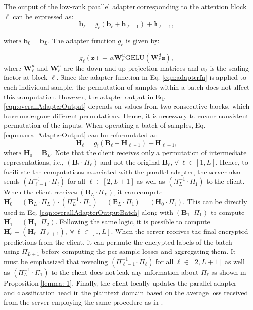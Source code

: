 The output of the low-rank parallel adapter corresponding to the attention block $\ell$ can be expressed as:
\begin{equation}
    \mathbf{h}_{\ell} = g_{\ell}(\mathbf{b}_{\ell} + \mathbf{h}_{\ell-1}) + \mathbf{h}_{\ell-1},
    \label{eqn:overallAdapterOutput}
\end{equation}

\noindent where $\mathbf{h}_{0} = \mathbf{b}_L$. The adapter function $g_{\ell}$ is given by:

\begin{equation}
    g_{\ell}(\mathbf{z}) = \alpha \mathbf{W}_{\ell}^u \text{GELU}(\mathbf{W}_{\ell}^d\mathbf{z}),
    \label{eqn:adapterfn}
\end{equation}
\noindent where $\mathbf{W}_{\ell}^d$ and $\mathbf{W}_{\ell}^u$ are the down and up-projection matrices and $\alpha_{\ell}$ is the scaling factor at block $\ell$. Since the adapter function in Eq. \ref{eqn:adapterfn} is applied to each individual sample, the permutation of samples within a batch does not affect this computation. However, the adapter output in Eq. \ref{eqn:overallAdapterOutput} depends on values from two consecutive blocks, which have undergone different permutations. Hence, it is necessary to ensure consistent permutation of the inputs. When operating a batch of samples, Eq. \ref{eqn:overallAdapterOutput} can be reformulated as:
\begin{equation}
    \mathbf{H}_{\ell} = g_{\ell}(\mathbf{B}_{\ell} + \mathbf{H}_{\ell-1}) + \mathbf{H}_{\ell-1},
    \label{eqn:overallAdapterOutputBatch}
\end{equation}
\noindent where $\mathbf{H}_{0} = \mathbf{B}_L$. Note that the client receives only a permutation of intermediate representations, i.e., $(\mathbf{B}_{\ell} \cdot \Pi_{\ell})$ and not the original $\mathbf{B}_{\ell}$, $\forall~ \ell \in [1,L]$. Hence, to facilitate the computations associated with the parallel adapter, the server also sends $(\Pi_{\ell-1}^{-1} \cdot \Pi_{\ell})$ for all $\ell \in [2,L+1]$ as well as $(\Pi_{L}^{-1} \cdot \Pi_{1})$ to the client. When the client receives $(\mathbf{B}_{L} \cdot \Pi_{L})$, it can compute $\mathbf{H}^{'}_{0} = (\mathbf{B}_L \cdot \Pi_{L}) \cdot (\Pi_{L}^{-1} \cdot \Pi_{1}) = (\mathbf{B}_L \cdot \Pi_{1}) = (\mathbf{H}_{0} \cdot \Pi_{1})$. This can be directly used in Eq. \ref{eqn:overallAdapterOutputBatch} along with $(\mathbf{B}_{1} \cdot \Pi_{1})$ to compute $\mathbf{H}^{'}_{1} = (\mathbf{H}_{1} \cdot \Pi_{2})$. Following the same logic, it is possible to compute $\mathbf{H}^{'}_{\ell} = (\mathbf{H}_{\ell} \cdot \Pi_{\ell+1}), ~ \forall~ \ell \in [1,L]$. When the server receives the final encrypted predictions from the client, it can permute the encrypted labels of the batch using $\Pi_{L+1}$ before computing the per-sample losses and aggregating them. It must be emphasized that revealing $(\Pi_{\ell-1}^{-1} \cdot \Pi_{\ell})$ for all $\ell \in [2,L+1]$ as well as $(\Pi_{L}^{-1} \cdot \Pi_{1})$ to the client does not leak any information about $\Pi_{\ell}$ as shown in Proposition \ref{lemma: 1}. Finally, the client locally updates the parallel adapter and classification head in the plaintext domain based on the average loss received from the server employing the same procedure as in \cite{poirot2019split}. 

